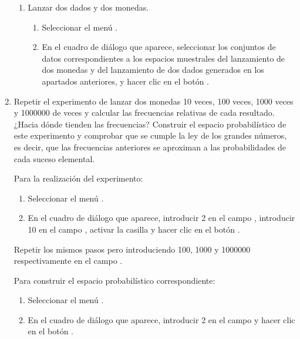 \begin{enumerate}[leftmargin=*]
\begin{enumerate}
\item Lanzar dos dados y dos monedas. 
\begin{indicacion}{
\begin{enumerate}
\item Seleccionar el menú .
\item En el cuadro de diálogo que aparece, seleccionar los conjuntos de datos correspondientes a los espacios muestrales del lanzamiento de
dos monedas y del lanzamiento de dos dados generados en los apartados anteriores, y hacer clic en el botón .
\end{enumerate}
}
\end{indicacion}
\end{enumerate}  

\item Repetir el experimento de lanzar dos monedas 10 veces, 100 veces, 1000 veces y 1000000 de veces y calcular las frecuencias relativas
de cada resultado. 
¿Hacia dónde tienden las frecuencias? 
Construir el espacio probabilístico de este experimento y comprobar que se cumple la ley de los grandes números, es decir, que las
frecuencias anteriores se aproximan a las probabilidades de cada suceso elemental.
\begin{indicacion}{
Para la realización del experimento:
\begin{enumerate}
\item Seleccionar el menú .
\item En el cuadro de diálogo que aparece, introducir 2 en el campo , introducir 10 en el campo , activar la casilla  y hacer clic en el botón .
\end{enumerate}
Repetir los mismos pasos pero introduciendo 100, 1000 y 1000000 respectivamente en el campo .

Para construir el espacio probabilístico correspondiente:
\begin{enumerate}
\item Seleccionar el menú .
\item En el cuadro de diálogo que aparece, introducir 2 en el campo  y hacer clic en el botón .
\end{enumerate}
}
\end{indicacion}


\end{enumerate}
